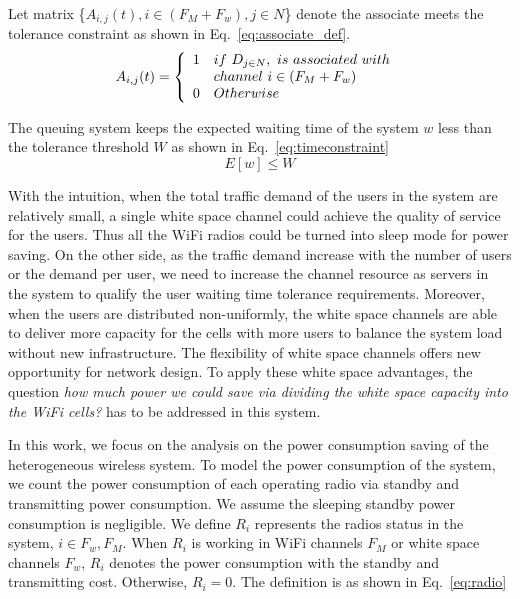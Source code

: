 Let matrix \{$A_{i,j}(t),i\in (F_M+F_w), j\in N$\} denote the associate meets the 
tolerance constraint as shown in Eq.~\ref{eq:associate_def}.
\begin{equation}
\label{eq:associate_def}
 A_{i,j}(t) = \left\{ 
	  \begin{array}{l l}
	    1   &  if\ D_{j\in N},\ is\ associated\ with\ \\
		& channel\ i \in (F_M+F_w) \\
		0 &  Otherwise
			    \end{array} \right.
\end{equation}

The queuing system keeps the expected waiting time of the system $w$ less than the tolerance threshold $W$ 
as shown in Eq.~\ref{eq:timeconstraint}
\begin{equation}
\label{eq:timeconstraint}
E[w]\le W
\end{equation}

With the intuition, when the total traffic demand of the users in the system are relatively small, a single 
white space channel could achieve the quality of service for the users. Thus all the WiFi radios could be turned 
into sleep mode for power saving. 
On the other side, as the traffic demand increase with the number of users or the demand per user, we need 
to increase the channel resource as servers in the system to qualify the user waiting time tolerance requirements. 
Moreover, when the users are distributed non-uniformly, the white space channels are able to deliver more capacity for 
the cells with more users to balance the system load without new infrastructure. 
The flexibility of white space channels offers new opportunity for network design.
To apply these white space advantages, the question {\it how much power we could save via dividing the white space 
capacity into the WiFi cells?} has to be addressed in this system.

In this work, we focus on the analysis on the power consumption saving of the heterogeneous wireless system. 
To model the power consumption of the system, we count the power consumption of each operating radio via 
standby and transmitting power consumption.
We assume the sleeping standby power consumption is negligible. 
We define $R_i$ represents the radios status in the system, $i\in {F_w,F_M}$. 
When $R_i$ is working in WiFi channels $F_M$ or white space channels $F_w$, $R_i$ denotes the power consumption 
with the standby and transmitting cost. 
Otherwise, $R_i = 0$. The definition is as shown in Eq.~\ref{eq:radio}

